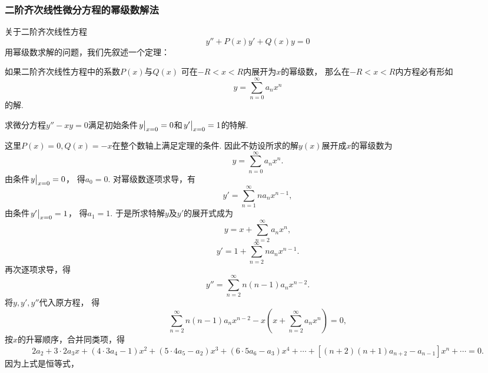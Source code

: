 \subsubsection{二阶齐次线性微分方程的幂级数解法}
关于二阶齐次线性方程\begin{equation*}
	y'' + P(x) y' + Q(x) y = 0
\end{equation*}用幂级数求解的问题，我们先叙述一个定理：
\begin{theorem}
如果二阶齐次线性方程中的系数\(P(x)\)与\(Q(x)\)
可在\(-R<x<R\)内展开为\(x\)的幂级数，
那么在\(-R<x<R\)内方程必有形如\begin{equation*}
	y = \sum_{n=0}^\infty a_n x^n
\end{equation*}的解.
\end{theorem}

\begin{example}
求微分方程\(y''-xy=0\)满足初始条件\(\eval{y}_{x=0}=0\)和\(\eval{y'}_{x=0}=1\)的特解.
\begin{solution}
这里\(P(x)=0, Q(x)=-x\)在整个数轴上满足定理的条件.
因此不妨设所求的解\(y(x)\)展开成\(x\)的幂级数为\begin{equation*}
	y = \sum_{n=0}^\infty a_n x^n.
\end{equation*}
由条件\(\eval{y}_{x=0}=0\)，
得\(a_0=0\).
对幂级数逐项求导，有\begin{equation*}
	y' = \sum_{n=1}^\infty n a_n x^{n-1},
\end{equation*}
由条件\(\eval{y'}_{x=0}=1\)，
得\(a_1=1\).
于是所求特解\(y\)及\(y'\)的展开式成为\begin{equation*}
	y = x + \sum_{n=2}^\infty a_n x^n,
\end{equation*}\begin{equation*}
	y' = 1 + \sum_{n=2}^\infty n a_n x^{n-1}.
\end{equation*}
再次逐项求导，得\begin{equation*}
	y'' = \sum_{n=2}^\infty n(n-1) a_n x^{n-2}.
\end{equation*}
将\(y,y',y''\)代入原方程，
得\begin{equation*}
	\sum_{n=2}^\infty n(n-1) a_n x^{n-2}
	- x \left( x + \sum_{n=2}^\infty a_n x^n \right)
	= 0,
\end{equation*}
按\(x\)的升幂顺序，合并同类项，得\begin{equation*}
	2 a_2 + 3\cdot2 a_3 x + (4\cdot3 a_4 - 1) x^2
	+ (5\cdot4 a_5 - a_2) x^3 + (6\cdot5 a_6 - a_3) x^4
	+ \dotsb + [(n+2)(n+1) a_{n+2} - a_{n-1}] x^n + \dotsb
	= 0.
\end{equation*}
因为上式是恒等式，

\end{solution}
\end{example}
